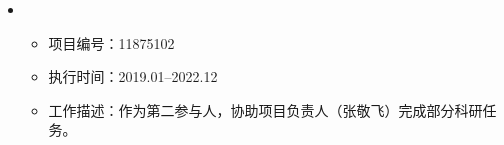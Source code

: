   \begin{itemize}[leftmargin=*]
    \item
      {\small
      \begin{itemize}
%
        \item 项目编号：11875102
        \item 执行时间：2019.01--2022.12        
        \item 工作描述：作为第二参与人，协助项目负责人（张敬飞）完成部分科研任务。
      \end{itemize}
      }
  \end{itemize}